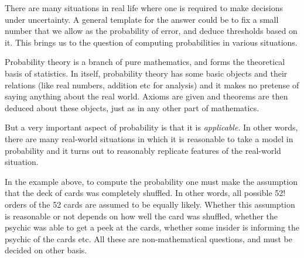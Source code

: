 \documentclass[preprint,  11pt]{amsart}
\theoremstyle{plain} %
\theoremstyle{definition} %
\begin{document}
 There are many situations in real life where one is required to make decisions under uncertainty. A general template for the answer could be to fix a small number that we allow as the probability of error, and deduce thresholds based on it. This brings us to the question of computing probabilities in various situations.



\vspace{4mm}
 Probability theory is a branch of pure mathematics, and forms the theoretical basis of statistics. In itself, probability theory has some basic objects and their relations (like real numbers, addition etc for analysis) and it makes no pretense of saying anything about the real world. Axioms are given and theorems are then deduced about these objects, just as in any other part of mathematics.

But a very important aspect of probability is that it is {\em applicable}. In other words, there are many real-world situations in which it is reasonable to take a model in probability and it turns out to reasonably replicate features of  the real-world situation.

In the example above, to compute the probability one must make the assumption that the deck of cards was completely shuffled. In other words, all possible 52! orders of the 52 cards are assumed to be equally likely. Whether this assumption is reasonable or not depends on how well the card was shuffled, whether the psychic was able to get a peek at the cards, whether some insider is informing the psychic of the cards etc. All these are non-mathematical questions, and must be decided on other basis.
\end{document}
